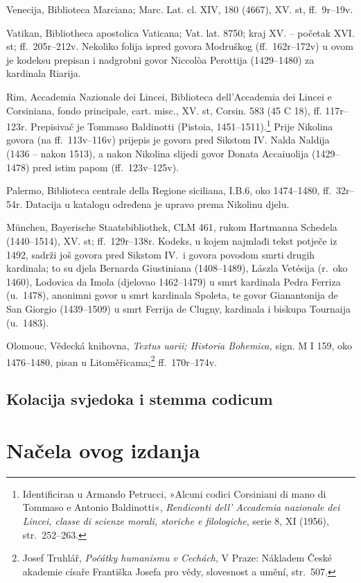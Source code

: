 \documentclass[a5paper,twoside]{article}
\begin{document}
\begin{description}[nolistsep,itemsep=3pt,font=\rmfamily]
\item[ve] Venecija, Biblioteca Marciana; Marc. Lat. cl. XIV, 180 (4667), XV. st, ff.~9r–19v.
\item[va] Vatikan, Bibliotheca apostolica Vaticana; Vat. lat. 8750; kraj XV. – početak XVI. st; ff.~205r–212v. Nekoliko folija ispred govora Modruškog (ff.~162r–172v) u ovom je kodeksu prepisan i nadgrobni govor Niccolòa Perottija (1429–1480) za kardinala Riarija.
\item[co] Rim, Accademia Nazionale dei Lincei, Biblioteca dell'Accademia dei Lincei e Corsiniana, fondo principale, cart. misc., XV. st, Corsin. 583 (45 C 18), ff. 117r–123r. Prepisivač je Tommaso Baldinotti (Pistoia, 1451–1511).\footnote{Identificiran u Armando Petrucci, »Alcuni codici Corsiniani di mano di Tommaso e Antonio Baldinotti«, \textit{Rendiconti dell' Accademia nazionale dei Lincei, classe di scienze morali, storiche e filologiche}, serie 8, XI (1956), str.~252–263.} Prije Nikolina govora (na ff.~113v–116v) prijepis je govora pred Sikstom IV. Nalda Naldija (1436 – nakon 1513), a nakon Nikolina slijedi govor Donata Accaiuolija (1429–1478) pred istim papom (ff.~123v–125v).
\item[pa] Palermo, Biblioteca centrale della Regione siciliana, I.B.6, oko 1474–1480, ff.~32r–54r. Datacija u katalogu određena je upravo prema Nikolinu djelu.
\item[m] München, Bayerische Staatsbibliothek, CLM 461, rukom Hartmanna Schedela (1440–1514), XV. st; ff.~129r–138r. Kodeks, u kojem najmlađi tekst potječe iz 1492, sadrži još govora pred Sikstom IV.\ i govora povodom smrti drugih kardinala; to su djela Bernarda Giustiniana (1408–1489), Lászla Vetésija (r.~oko 1460), Lodovica da Imola (djelovao 1462–1479) u smrt kardinala Pedra Ferriza (u.~1478), anonimni govor u smrt kardinala Spoleta, te govor Gianantonija de San Giorgio (1439–1509) u smrt Ferrija de Clugny, kardinala i biskupa Tournaija (u.~1483).
\item[o] Olomouc, Vědecká knihovna, \textit{Textus uarii; Historia Bohemica,} sign. M I 159, oko 1476–1480, pisan u Litoměřicama;\footnote{Josef Truhlář, \textit{Počátky humanismu v Cechách}, V Praze: Nákladem České akademie císaře Františka Josefa pro vědy, slovesnost a umění, str.~507.} ff.~170r–174v.
\end{description}

\subsection{Kolacija svjedoka i stemma codicum}

\section{Načela ovog izdanja}
\end{document}
